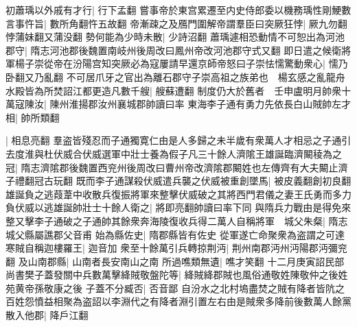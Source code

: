 初蕭瑀以外戚有才行|{
	行下孟翻}
嘗事帝於東宫累遷至内史侍郎委以機務瑀性剛鯁數言事忤旨|{
	數所角翻忤五故翻}
帝漸疎之及鴈門圍解帝謂羣臣曰突厥狂悖|{
	厥九勿翻悖蒲妹翻又蒲没翻}
勢何能為少時未散|{
	少詩沼翻}
蕭瑀遽相恐動情不可恕出為河池郡守|{
	隋志河池郡後魏置南岐州後周改曰鳳州帝改河池郡守式又翻}
即日遣之候衛將軍楊子崇從帝在汾陽宫知突厥必為寇屢請早還京師帝怒曰子崇怯懦驚動衆心|{
	懦乃卧翻又乃亂翻}
不可居爪牙之官出為離石郡守子崇高祖之族弟也　楊玄感之亂龍舟水殿皆為所焚詔江都更造凡數千艘|{
	艘蘇遭翻}
制度仍大於舊者　壬申盧明月帥衆十萬寇陳汝|{
	陳州淮揚郡汝州襄城郡帥讀曰率}
東海李子通有勇力先依長白山賊帥左才相|{
	帥所類翻}


|{
	相息亮翻}
羣盗皆殘忍而子通獨寛仁由是人多歸之未半歲有衆萬人才相忌之子通引去度淮與杜伏威合伏威選軍中壯士養為假子凡三十餘人濟隂王雄誕臨濟闞稜為之冠|{
	隋志濟隂郡後魏置西兖州後周改曰曹州帝改濟隂郡闞姓也左傳齊有大夫闞止濟子禮翻冠古玩翻}
既而李子通謀殺伏威遣兵襲之伏威被重創墜馬|{
	被皮義翻創初良翻}
雄誕負之逃葭葦中收散兵復振將軍來整擊伏威破之其將西門君儀之妻王氏勇而多力負伏威以逃雄誕帥壯士十餘人衛之|{
	將即亮翻帥讀曰率下同}
與隋兵力戰由是得免來整又擊李子通破之子通帥其餘衆奔海陵復收兵得二萬人自稱將軍　城父朱粲|{
	隋志城父縣屬譙郡父音甫}
始為縣佐史|{
	隋郡縣皆有佐史}
從軍遂亡命聚衆為盗謂之可達寒賊自稱迦樓羅王|{
	迦音加}
衆至十餘萬引兵轉掠荆沔|{
	荆州南郡沔州沔陽郡沔彌兖翻}
及山南郡縣|{
	山南者長安南山之南}
所過噍類無遺|{
	噍才笑翻}
十二月庚寅詔民部尚書樊子蓋發關中兵數萬擊絳賊敬盤陀等|{
	絳賊絳郡賊也風俗通敬姓陳敬仲之後姓苑黄帝孫敬康之後}
子蓋不分臧否|{
	否音鄙}
自汾水之北村塢盡焚之賊有降者皆阬之百姓怨憤益相聚為盗詔以李淵代之有降者淵引置左右由是賊衆多降前後數萬人餘黨散入他郡|{
	降戶江翻}


